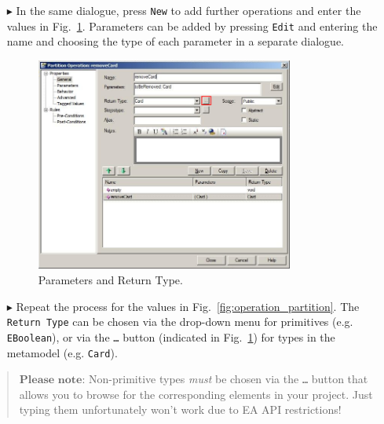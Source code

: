 \begin{enumerate}
\item[$\blacktriangleright$] In the same dialogue, press \texttt{New} to add further operations and enter the values in Fig.~\ref{fig:operation_parameters}.  Parameters can be added by pressing \texttt{Edit} and entering the name and choosing the type of each parameter in a separate dialogue.

\begin{figure}[htbp]
	\centering
  \includegraphics[width=0.8\textwidth]{pics/memBoxBilder/memBox38.png}
	\caption{Parameters and Return Type.}
	\label{fig:operation_parameters} 
\end{figure}

\item[$\blacktriangleright$] Repeat the process for the values in Fig.~\ref{fig:operation_partition}.  
The \texttt{Return Type} can be chosen via the drop-down menu for primitives (e.g. \texttt{EBoolean}), or via the \texttt{\ldots} button (indicated in Fig.~\ref{fig:operation_parameters}) for types in the metamodel (e.g. \texttt{Card}).
\end{enumerate}

\vspace{-.5cm}
\begin{quote}
$\textbf{Please note:}$ Non-primitive types \emph{must} be chosen via the \texttt{\ldots} button that allows you to browse for the corresponding elements in your project.  
Just typing them unfortunately won't work due to EA API restrictions!
\end{quote}
\vspace{-.5cm}

